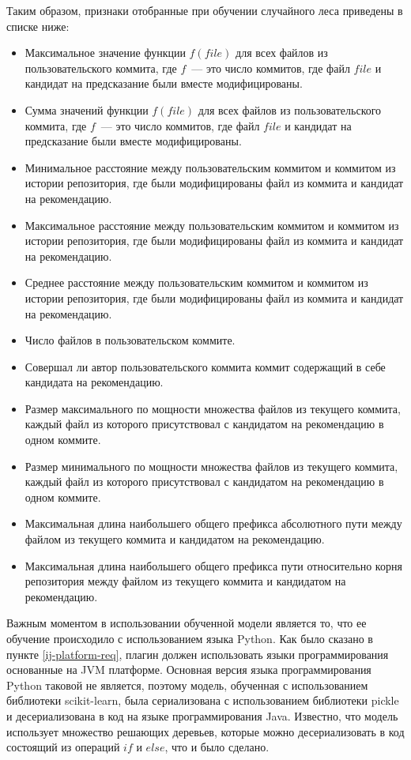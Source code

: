 Таким образом, признаки отобранные при обучении случайного леса приведены в списке ниже:
\begin{itemize}
    \item Максимальное значение функции $f(file)$ для всех файлов из пользовательского коммита, где $f$~--- это число коммитов, где файл $file$ и кандидат на предсказание были вместе модифицированы.
    \item Сумма значений функции $f(file)$ для всех файлов из пользовательского коммита, где $f$~--- это число коммитов, где файл $file$ и кандидат на предсказание были вместе модифицированы.
    \item Минимальное расстояние между пользовательским коммитом и коммитом из истории репозитория, где были модифицированы файл из коммита и кандидат на рекомендацию.
    \item Максимальное расстояние между пользовательским коммитом и коммитом из истории репозитория, где были модифицированы файл из коммита и кандидат на рекомендацию.
    \item Среднее расстояние между пользовательским коммитом и коммитом из истории репозитория, где были модифицированы файл из коммита и кандидат на рекомендацию.
    \item Число файлов в пользовательском коммите.
    \item Совершал ли автор пользовательского коммита коммит содержащий в себе кандидата на рекомендацию.
    \item Размер максимального по мощности множества файлов из текущего коммита, каждый файл из которого присутствовал с кандидатом на рекомендацию в одном коммите.
    \item Размер минимального по мощности множества файлов из текущего коммита, каждый файл из которого присутствовал с кандидатом на рекомендацию в одном коммите.
    \item Максимальная длина наибольшего общего префикса абсолютного пути между файлом из текущего коммита и кандидатом на рекомендацию.
    \item Максимальная длина наибольшего общего префикса пути относительно корня репозитория между файлом из текущего коммита и кандидатом на рекомендацию.
\end{itemize}

Важным моментом в использовании обученной модели является то, что ее обучение происходило с использованием языка Python. Как было сказано в пункте \ref{ij-platform-req}, плагин должен использовать языки программирования основанные на JVM платформе. Основная версия языка программирования Python таковой не является, поэтому модель, обученная с использованием библиотеки scikit-learn, была сериализована с использованием библиотеки pickle и десериализована в код на языке программирования Java. Известно, что модель использует множество решающих деревьев, которые можно десериализовать в код состоящий из операций $if$ и $else$, что и было сделано. 

